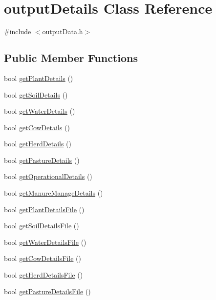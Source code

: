 \hypertarget{classoutput_details}{
\section{outputDetails Class Reference}
\label{classoutput_details}
}


{\ttfamily \#include $<$outputData.h$>$}\subsection*{Public Member Functions}
\begin{DoxyCompactItemize}
\item 
bool \hyperlink{classoutput_details_a8016daa0937dbb46a90a81a93daa6517}{getPlantDetails} ()
\item 
bool \hyperlink{classoutput_details_a084ee6303ae763562e96ac5e063e862c}{getSoilDetails} ()
\item 
bool \hyperlink{classoutput_details_a667375635e4c976a69e6e7867fa311e4}{getWaterDetails} ()
\item 
bool \hyperlink{classoutput_details_a9fd56e7141ada659cbc818a008d3eeeb}{getCowDetails} ()
\item 
bool \hyperlink{classoutput_details_a9623698b2eba176c6bb52b5e3ae9ef9d}{getHerdDetails} ()
\item 
bool \hyperlink{classoutput_details_a6f2663357cecc863a74ffa3b36edbdfa}{getPastureDetails} ()
\item 
bool \hyperlink{classoutput_details_a14785a499d3ddb916b66f39cf8ec88ba}{getOperationalDetails} ()
\item 
bool \hyperlink{classoutput_details_a1fc8c1e6beb1f783514cd98751e1bf6c}{getManureManageDetails} ()
\item 
bool \hyperlink{classoutput_details_aa9e6ecef332c3157a4a0895533503e00}{getPlantDetailsFile} ()
\item 
bool \hyperlink{classoutput_details_ae3df555b2d6360a15e07c99d3e00c1bc}{getSoilDetailsFile} ()
\item 
bool \hyperlink{classoutput_details_a0d21d1cdfc5b28c83d1b73f503265fdc}{getWaterDetailsFile} ()
\item 
bool \hyperlink{classoutput_details_a21f6adac13fb038202eb1c176f6ac818}{getCowDetailsFile} ()
\item 
bool \hyperlink{classoutput_details_a74904bcfcda0f92b049a4dd15d4da317}{getHerdDetailsFile} ()
\item 
bool \hyperlink{classoutput_details_abbf31469aa10a5f203eb0304735356b8}{getPastureDetailsFile} ()

\end{DoxyCompactItemize}
